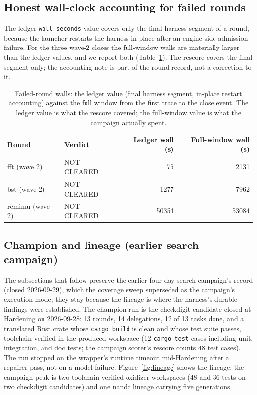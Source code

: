 \documentclass[11pt]{article}
\begin{document}
\subsection{Honest wall-clock accounting for failed rounds}
\label{sec:honestwalls}

The ledger \texttt{wall\_seconds} value covers only the final harness
segment of a round, because the launcher restarts the harness in place
after an engine-side admission failure. For the three wave-2 closes the
full-window walls are materially larger than the ledger values, and we
report both (Table~\ref{tab:honestwalls}). The rescore covers the final
segment only; the accounting note is part of the round record, not a
correction to it.

\begin{table}[ht]
\centering
\begin{tabular}{@{}llrr@{}}
\toprule
Round & Verdict & Ledger wall (s) & Full-window wall (s) \\
\midrule
fft (wave 2) & \cellcolor{arcred}NOT CLEARED & 76 & 2131 \\
bst (wave 2) & \cellcolor{arcred}NOT CLEARED & 1277 & 7962 \\
remimu (wave 2) & \cellcolor{arcred}NOT CLEARED & 50354 & 53084 \\
\bottomrule
\end{tabular}
\caption{Failed-round walls: the ledger value (final harness segment,
in-place restart accounting) against the full window from the first
trace to the close event. The ledger value is what the rescore covered;
the full-window value is what the campaign actually spent.}
\label{tab:honestwalls}
\end{table}

\subsection{Champion and lineage (earlier search campaign)}

The subsections that follow preserve the earlier four-day search
campaign's record (closed 2026-09-29), which the coverage sweep
superseded as the campaign's execution mode; they stay because the
lineage is where the harness's durable findings were established. The
champion run is the checkdigit candidate closed at
\textsf{Hardening} on 2026-09-28: 13 rounds, 14 delegations, 12 of 13
tasks done, and a translated Rust crate whose \texttt{cargo build} is
clean and whose test suite passes, toolchain-verified
in the produced workspace (12 \texttt{cargo test} cases including unit,
integration, and doc tests; the campaign scorer's rescore counts 48
test cases). The run stopped on the wrapper's runtime
timeout mid-\textsf{Hardening} after a repairer pass, not on a model
failure. Figure~\ref{fig:lineage} shows the lineage: the campaign peak is
two toolchain-verified oxidizer workspaces (48 and 36 tests on two
checkdigit candidates) and one nandc lineage carrying five generations.
\end{document}
